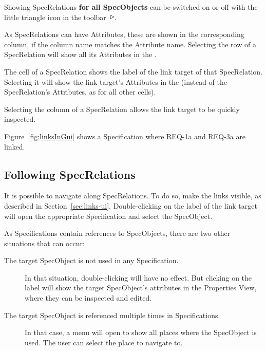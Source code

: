Showing SpecRelations \textbf{for all SpecObjects} can be switched on or off with the little triangle icon in the toolbar \includegraphics[height=0.8em]{../rmf-images/icons/full/obj16/SpecRelation.png}.

As SpecRelations can have Attributes, these are shown in the corresponding column, if the column name matches the Attribute name.  Selecting the row of a SpecRelation will show all its Attributes in the .

The  cell of a SpecRelation shows the label of the link target of that SpecRelation.  Selecting it will show the link target's Attributes in the  (instead of the SpecRelation's Attributes, as for all other cells).

\begin{info}
Selecting the  column of a SpecRelation allows the link target to be quickly inspected.
\end{info}

Figure~\ref{fig:linksInGui} shows a Specification where REQ-1a and REQ-3a are linked.

\subsection{Following SpecRelations}
\label{sec:follow-links}

It is possible to navigate along SpecRelations. To do so, make the links visible, as described in Section~\ref{sec:links-ui}. Double-clicking on the label of the link target will open the appropriate Specification and select the SpecObject.

As Specifications contain references to SpecObjects, there are two other situations that can occur:
\begin{description}

\item
  [The target SpecObject is not used in any Specification.] In that situation, double-clicking will have no effect. But clicking on the label will show the target SpecObject's attributes in the Properties View, where they can be inspected and edited.
\item
  [The target SpecObject is referenced multiple times in Specifications.] In that case, a menu will open to show all places where the SpecObject is used. The user can select the place to navigate to.
\end{description}


